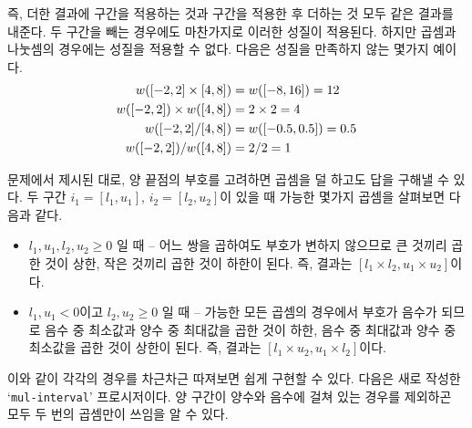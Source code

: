 즉, 더한 결과에 구간을 적용하는 것과 구간을 적용한 후 더하는 것 모두 같은
결과를 내준다. 두 구간을 빼는 경우에도 마찬가지로 이러한 성질이
적용된다. 하지만 곱셈과 나눗셈의 경우에는 성질을 적용할 수 없다. 다음은 성질을
만족하지 않는 몇가지 예이다.
\begin{align}
  w([-2,2]\times[4,8]) & = w([-8,16]) = 12 \notag \\
  w([-2,2]) \times w([4,8]) & = 2 \times 2 = 4 \notag \\
  w([-2,2]/[4,8]) & = w([-0.5,0.5]) = 0.5 \notag \\
  w([-2,2]) / w([4,8]) & = 2 / 2 = 1 \notag
\end{align}




문제에서 제시된 대로, 양 끝점의 부호를 고려하면 곱셈을 덜 하고도 답을 구해낼
수 있다. 두 구간 $i_1=[l_1,u_1]$, $i_2=[l_2,u_2]$이 있을 때 가능한 몇가지 곱셈을
살펴보면 다음과 같다.

\begin{itemize}
\item $l_1,u_1,l_2,u_2 \ge 0$ 일 때 -- 어느 쌍을 곱하여도 부호가 변하지
  않으므로 큰 것끼리 곱한 것이 상한, 작은 것끼리 곱한 것이 하한이 된다. 즉,
  결과는 $[l_1 \times l_2, u_1 \times u_2]$이다.
\item $l_1,u_1 < 0$이고 $l_2,u_2 \ge 0$ 일 때 -- 가능한 모든 곱셈의 경우에서
  부호가 음수가 되므로 음수 중 최소값과 양수 중 최대값을 곱한 것이 하한, 음수
  중 최대값과 양수 중 최소값을 곱한 것이 상한이 된다. 즉, 결과는 $[l_1 \times
  u_2, u_1 \times l_2]$이다.
\end{itemize}

이와 같이 각각의 경우를 차근차근 따져보면 쉽게 구현할 수 있다. 다음은 새로
작성한 `\texttt{mul-interval}' 프로시저이다. 양 구간이 양수와 음수에 걸쳐 있는
경우를 제외하곤 모두 두 번의 곱셈만이 쓰임을 알 수 있다.





